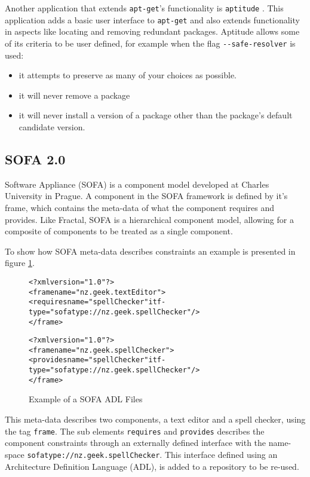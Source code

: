 Another application that extends \texttt{apt-get}'s functionality is \texttt{aptitude} \citep{Burrows2005}.
This application adds a basic user interface to \texttt{apt-get} and also extends functionality in aspects like locating and removing redundant packages.
Aptitude allows some of its criteria to be user defined, for example when the flag \verb+--safe-resolver+ is used:
\begin{itemize}
  \item it attempts to preserve as many of your choices as possible.
  \item it will never remove a package
  \item it will never install a version of a package other than the package's default candidate version.
\end{itemize}

\subsection{SOFA 2.0}
Software Appliance (SOFA) \citep{Hnetynka2006} is a component model developed at Charles University in Prague.
A component in the SOFA framework is defined by it's frame, which contains the meta-data of what the component requires and provides.
Like Fractal, SOFA is a hierarchical component model, allowing for a composite of components to be treated as a single component.

To show how SOFA meta-data describes constraints an example is presented in figure \ref{SOFAmetadata}.

\begin{figure}[htp] 
\begin{center}
\begin{alltt}
<?xml version="1.0"?>
<frame name="nz.geek.textEditor">
  <requires name="spellChecker" itf-type="sofatype://nz.geek.spellChecker"/>
</frame>

<?xml version="1.0"?>
<frame name="nz.geek.spellChecker">
  <provides name="spellChecker" itf-type="sofatype://nz.geek.spellChecker"/>
</frame>
\end{alltt}
  \caption{Example of a SOFA ADL Files}
  \label{SOFAmetadata}
\end{center}
\end{figure}

This meta-data describes two components, a text editor and a spell checker, using the tag \texttt{frame}.
The sub elements \texttt{requires} and \texttt{provides} describes the component constraints through an externally defined interface with the name-space \texttt{sofatype://nz.geek.spellChecker}.
This interface defined using an Architecture Definition Language (ADL), is added to a repository to be re-used. 


